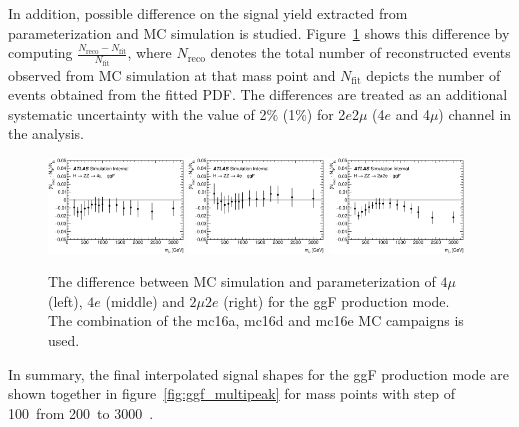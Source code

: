 In addition, possible difference on the signal yield extracted from parameterization and MC simulation is studied.
Figure~\ref{fig:ggf_graph_YieldCheckAll} shows this difference by computing $\frac{N_{\text{reco}}-N_{\text{fit}}}{N_{\text{fit}}}$, where $N_{\text{reco}}$ denotes the total number of reconstructed events observed from MC simulation at that mass point
and $N_{\text{fit}}$ depicts the number of events obtained from the fitted PDF.
The differences are treated as an additional systematic uncertainty with the value of 2\% (1\%) for 2$e$2$\mu$ (4$e$ and 4$\mu$) channel in the analysis.

\begin{figure}[htbp]
    \centering
    \includegraphics[width=0.32\textwidth]{figures/HMHZZ/signal/NWA//ggf_graph_YieldCheck_4mu_fixed.eps}
    \includegraphics[width=0.32\textwidth]{figures/HMHZZ/signal/NWA//ggf_graph_YieldCheck_4e_fixed.eps}
    \includegraphics[width=0.32\textwidth]{figures/HMHZZ/signal/NWA//ggf_graph_YieldCheck_2mu2e_fixed.eps}
    \caption{The difference between MC simulation and parameterization of
    $4\mu$ (left), $4e$ (middle) and $2\mu 2e$ (right) for the ggF production
    mode. The combination of the mc16a, mc16d and mc16e MC campaigns is used.}
    \label{fig:ggf_graph_YieldCheckAll}
\end{figure}

In summary, the final interpolated signal shapes for the ggF production mode are shown together in figure~\ref{fig:ggf_multipeak} for mass points with step of 100~\gev from 200~\gev to 3000~\gev.

